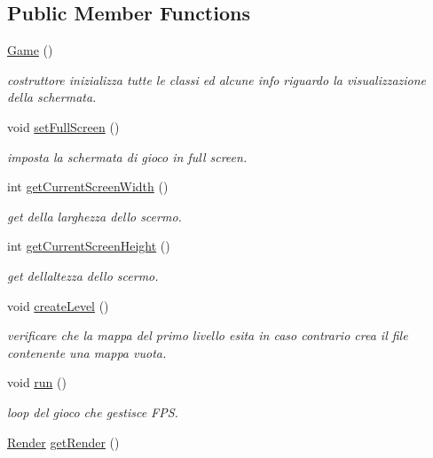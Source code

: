 \subsection*{Public Member Functions}
\begin{DoxyCompactItemize}
\item 
\hyperlink{classprogetto_1_1_game_a98d87ba6bde3f389e92664a2ef9bfcb1}{Game} ()
\begin{DoxyCompactList}\small\item\em costruttore inizializza tutte le classi ed alcune info riguardo la visualizzazione della schermata. \end{DoxyCompactList}\item 
void \hyperlink{classprogetto_1_1_game_a7ac5b05774724411897684758dec30f9}{set\+Full\+Screen} ()
\begin{DoxyCompactList}\small\item\em imposta la schermata di gioco in full screen. \end{DoxyCompactList}\item 
int \hyperlink{classprogetto_1_1_game_ad285af3491631b7569ae47a066925af7}{get\+Current\+Screen\+Width} ()
\begin{DoxyCompactList}\small\item\em get della larghezza dello scermo. \end{DoxyCompactList}\item 
int \hyperlink{classprogetto_1_1_game_a08d0108e179608c5b692376d7af26351}{get\+Current\+Screen\+Height} ()
\begin{DoxyCompactList}\small\item\em get dell\textquotesingle{}altezza dello scermo. \end{DoxyCompactList}\item 
void \hyperlink{classprogetto_1_1_game_ad79f312dd3a9e52f38a9e5f1536537fd}{create\+Level} ()
\begin{DoxyCompactList}\small\item\em verificare che la mappa del primo livello esita in caso contrario crea il file contenente una mappa vuota. \end{DoxyCompactList}\item 
void \hyperlink{classprogetto_1_1_game_a13a43e6d814de94978c515cb084873b1}{run} ()
\begin{DoxyCompactList}\small\item\em loop del gioco che gestisce F\+PS. \end{DoxyCompactList}\item 
\hyperlink{classprogetto_1_1_render}{Render} \hyperlink{classprogetto_1_1_game_a4cf2c70ad6b93232b970eee06767cab1}{get\+Render} ()

\end{DoxyCompactItemize}
